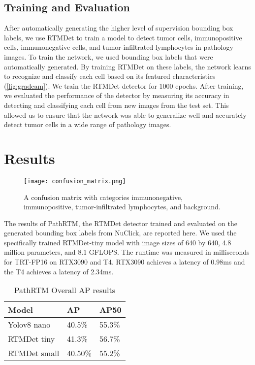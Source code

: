 \documentclass[runningheads]{llncs}
\begin{document}
\subsection{Training and Evaluation}

After automatically generating the higher level of supervision bounding box labels, we use RTMDet to train a model to detect tumor cells, immunopositive cells, immunonegative cells, and tumor-infiltrated lymphocytes in pathology images. To train the network, we used bounding box labels that were automatically generated. By training RTMDet on these labels, the network learns to recognize and classify each cell based on its featured characteristics (\ref{fig:gradcam}). We train the RTMDet detector for 1000 epochs. After training, we evaluated the performance of the detector by measuring its accuracy in detecting and classifying each cell from new images from the test set. This allowed us to ensure that the network was able to generalize well and accurately detect tumor cells in a wide range of pathology images.

\section{Results}

\begin{figure}
	\centering
	\texttt{[image: confusion\_matrix.png]}
	\caption{A confusion matrix with categories immunonegative, immunopositive, tumor-infiltrated lymphocytes, and background.  } \label{cm}
\end{figure}


The results of PathRTM, the RTMDet detector trained and evaluated on the generated bounding box labels from NuClick, are reported here. We used the specifically trained RTMDet-tiny model with image sizes of 640 by 640, 4.8 million parameters, and 8.1 GFLOPS. The runtime was measured in milliseconds for TRT-FP16 on RTX3090 and T4. RTX3090 achieves a latency of 0.98ms and the T4 achieves a latency of 2.34ms.

\begin{table}
	\centering
	\caption{PathRTM Overall AP results}\label{tab1}
	\begin{tabular}{|l|l|l|}
		\hline
		{\bfseries Model} & {\bfseries AP} & {\bfseries AP50} \\
		\hline
		Yolov8 nano       & 40.5\%         & 55.3\%           \\
		RTMDet tiny       & 41.3\%         & 56.7\%           \\
		RTMDet small      & 40.50\%         & 55.2\%           \\
		\hline
	\end{tabular}
\end{table}
\end{document}

